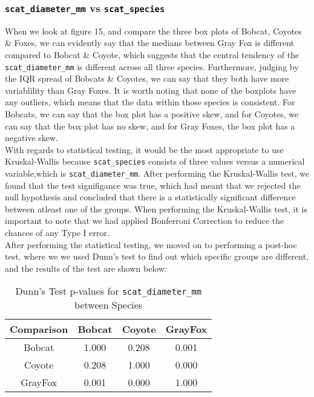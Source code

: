 \documentclass[a4paper]{article}
\begin{document}
\newpage

\subsubsection{\texttt{scat\_diameter\_mm} vs \texttt{scat\_species}}
When we look at figure 15, and compare the three box plots of Bobcat, Coyotes \& Foxes, we can evidently say that the medians between Gray Fox is different
compared to Bobcat \& Coyote, which suggests that the central tendency of the \texttt{scat\_diameter\_mm} is different across all three species. Furthermore, 
judging by the IQR spread of Bobcats \& Coyotes, we can say that they both have more variablility than Gray Foxes. It is worth noting that none of the 
boxplots have any outliers, which means that the data within those species is consistent. For Bobcats, we can say that the box plot has a positive skew, and 
for Coyotes, we can say that the box plot has no skew, and for Gray Foxes, the box plot has a negative skew. \\

\noindent With regards to statistical testing, it would be the most appropriate to use Kruskal-Wallis because \texttt{scat\_species} consists of three values
versus a numerical variable,which is \texttt{scat\_diameter\_mm}. After performing the Kruskal-Wallis test, we found that the test signifigance was true,
which had meant that we rejected the null hypothesis and concluded that there is a statistically significant difference between atleast one of the groups.
When performing the Kruskal-Wallis test, it is important to note that we had applied Bonferroni Correction to reduce the chances of any Type I error. \\

\noindent After performing the statistical testing, we moved on to performing a post-hoc test, where we we used Dunn's test to find out which specific 
groups are different, and the results of the test are shown below: \\
\begin{table}[h]
    \centering
    \begin{tabular}{|c|c|c|c|}
    \hline
    \textbf{Comparison} & \textbf{Bobcat} & \textbf{Coyote} & \textbf{GrayFox} \\
    \hline
    Bobcat & 1.000 & 0.208 & 0.001 \\
    Coyote & 0.208 & 1.000 & 0.000 \\
    GrayFox & 0.001 & 0.000 & 1.000 \\
    \hline
    \end{tabular}
    \caption{Dunn's Test p-values for \texttt{scat\_diameter\_mm} between Species}
    \label{tab:dunn_test_results}
\end{table}
\end{document}

